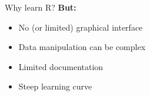 \documentclass[aspectratio=169]{beamer}\usepackage[]{graphicx}\usepackage[]{color}
\begin{document}
% 
\begin{frame}{Why learn R?}
\textbf{But:}
\begin{itemize}
  \item No (or limited) graphical interface
	\item Data manipulation can be complex
	\item Limited documentation
	\item Steep learning curve
\end{itemize}
\end{frame}
\end{document}
